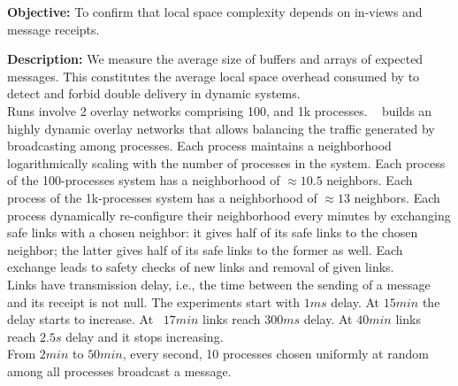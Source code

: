 \noindent \textbf{Objective:} To confirm that local space complexity
depends on in-views and message receipts.

\noindent \textbf{Description:} We measure the average size of buffers and
arrays of expected messages. This constitutes the average local space overhead
consumed by \RPCBROADCAST to detect and forbid double delivery in dynamic
systems.\\
Runs involve 2 overlay networks comprising 100, and 1k
processes. \SPRAY~\cite{nedelec2017adaptive} builds an highly dynamic overlay
networks that allows balancing the traffic generated by broadcasting among
processes. Each process maintains a neighborhood logarithmically scaling with
the number of processes in the system. Each process of the 100-processes system
has a neighborhood of $\approx 10.5$ neighbors. Each process of the 1k-processes
system has a neighborhood of $\approx 13$ neighbors. Each process dynamically
re-configure their neighborhood every minutes by exchanging safe links with a
chosen neighbor: it gives half of its safe links to the chosen neighbor; the
latter gives half of its safe links to the former as well. Each exchange leads
to safety checks of new links and removal of given links.\\ Links have
transmission delay, i.e., the time between the sending of a message and its
receipt is not null. The experiments start with $1ms$ delay. At $15min$ the
delay starts to increase. At ~$17min$ links reach $300ms$ delay. At $40min$
links reach $2.5s$ delay and it stops increasing.\\
From $2min$ to $50min$, every second, 10 processes chosen uniformly at random
among all processes broadcast a message.

